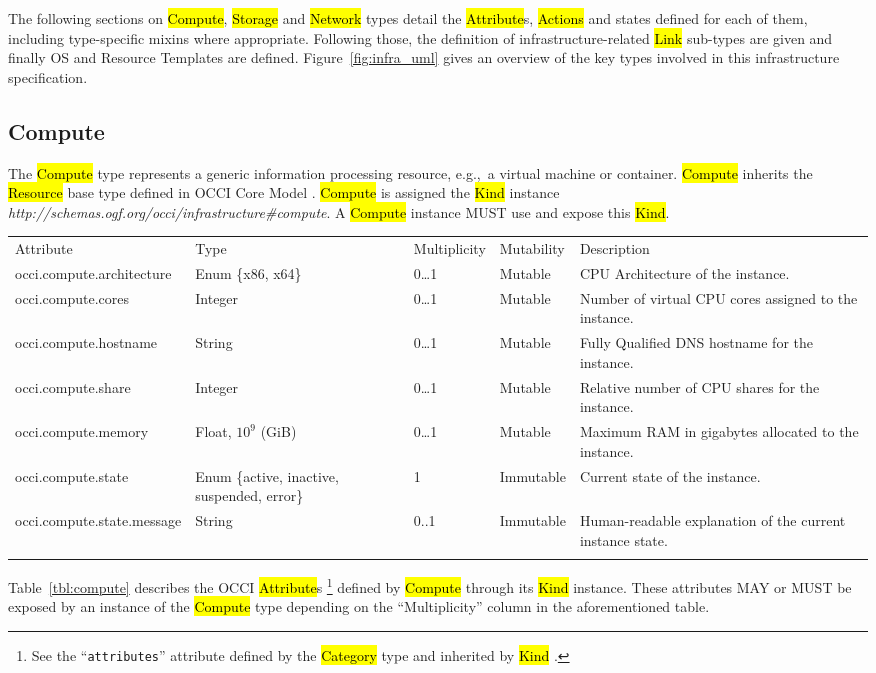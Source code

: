 \documentclass[10pt,a4paper]{article}
\begin{document}
The following sections on \hl{Compute}, \hl{Storage} and \hl{Network}
types detail the \hl{Attribute}s, \hl{Actions} and states defined for
each of them, including type-specific mixins where appropriate.
Following those, the definition of infrastructure-related \hl{Link}
sub-types are given and finally OS and Resource Templates
are defined. Figure~\ref{fig:infra_uml} gives an overview of
the key types involved in this infrastructure specification.

\subsection{Compute}
The \hl{Compute} type represents a generic information processing
resource, e.g.,~a virtual machine or container. \hl{Compute} inherits
the \hl{Resource} base type defined in OCCI Core Model
\cite{occi:core}.  \hl{Compute} is assigned the \hl{Kind} instance
\textit{http://schemas.ogf.org/occi/infrastructure\#compute}.  A
\hl{Compute} instance MUST use and expose this \hl{Kind}.

{
	\begin{tabular}{lp{2.5cm}p{1cm}lp{5cm}}
	\toprule
	Attribute&Type&Multi\-plicity&Mutability&Description\\
	\colrule
	occi.compute.architecture & Enum \{x86, x64\} & 0\ldots1
	& Mutable & CPU Architecture of the instance.\\
	occi.compute.cores & Integer & 0\ldots1
	& Mutable & Number of virtual CPU cores assigned to the instance.\\
	occi.compute.hostname & String & 0\ldots1
	& Mutable & Fully Qualified DNS hostname for the instance.\\
	occi.compute.share & Integer & 0\ldots1
	& Mutable & Relative number of CPU shares for the instance.\\
	occi.compute.memory & Float, $10^9$ (GiB) & 0\ldots1
	& Mutable & Maximum RAM in gigabytes allocated to the instance.\\
	occi.compute.state & Enum \{active, inactive, suspended, error\} & 1
	& Immutable & Current state of the instance.\\
	occi.compute.state.message & String & 0..1
	& Immutable & Human-readable explanation of the current instance state.\\
	\botrule
	\end{tabular}
}

Table~\ref{tbl:compute} describes the OCCI \hl{Attribute}s%
\footnote{See the ``{\tt attributes}'' attribute defined by the
  \hl{Category} type and inherited by \hl{Kind} \cite{occi:core}.}
defined by \hl{Compute} through its \hl{Kind} instance. These attributes
MAY or MUST be exposed by an instance of the \hl{Compute} type
depending on the ``Multiplicity'' column in the aforementioned table.
\end{document}
